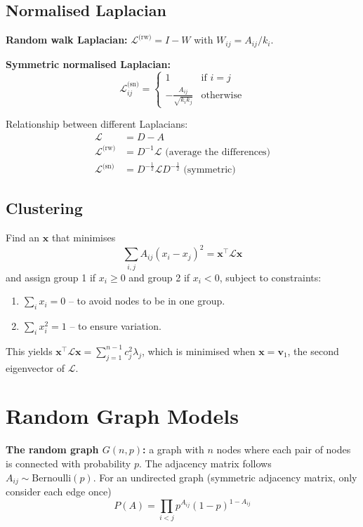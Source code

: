 \documentclass[12pt]{article}
\begin{document}
\subsection{Normalised Laplacian}
\textbf{Random walk Laplacian:} $\mathcal{L}^{\text{(rw)}} = I - W$ with $W_{ij} = A_{ij}/k_i$.

\textbf{Symmetric normalised Laplacian:}
$$
\mathcal{L}_{ij}^{\text{(sn)}} = 
\begin{cases}
1 & \text{if } i = j \\
-\frac{A_{ij}}{\sqrt{k_i k_j}} &\text{otherwise}
\end{cases}
$$

Relationship between different Laplacians:
\begin{align*}
\mathcal{L} &= D - A \\
\mathcal{L}^{\text{(rw)}} &= D^{-1} \mathcal{L} \text{ (average the differences)} \\
\mathcal{L}^{\text{(sn)}} &= D^{-\frac{1}{2}} \mathcal{L} D^{-\frac{1}{2}} \text{ (symmetric)}
\end{align*}

\subsection{Clustering}
Find an $\boldsymbol{x}$ that minimises
$$\sum_{i,j} A_{ij} (x_i - x_j)^2 = \boldsymbol{x}^\top \mathcal{L} \boldsymbol{x}$$
and assign group 1 if $x_i \geq 0$ and group 2 if $x_i < 0$, subject to constraints:
\begin{enumerate}
    \item $\sum_i x_i = 0$ -- to avoid nodes to be in one group.
    \item $\sum_i x_i^2 = 1$ -- to ensure variation.
\end{enumerate}

This yields $\boldsymbol{x}^\top \mathcal{L} \boldsymbol{x} = \sum_{j=1}^{n-1} c_j^2 \lambda_j$, which is minimised when $\boldsymbol{x} = \boldsymbol{v}_1$, the second eigenvector of $\mathcal{L}$.

\section{Random Graph Models}
\textbf{The random graph $G(n,p)$:} a graph with $n$ nodes where each pair of nodes is connected with probability $p$. The adjacency matrix follows $A_{ij} \sim \text{Bernoulli}(p)$.
For an undirected graph (symmetric adjacency matrix, only consider each edge once)
$$
P(A) = \prod_{i < j} p^{A_{ij}} (1-p)^{1 - A_{ij}}
$$
\end{document}
